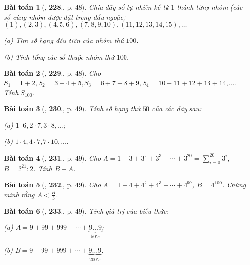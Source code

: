 \documentclass{article}
\numberwithin{equation}{section}
\newtheorem{baitoan}{Bài toán}[section]
\begin{document}
\begin{baitoan}[\cite{Binh_Toan_6_tap_1}, \textbf{228.}, p. 48]
	Chia dãy số tự nhiên kể từ $1$ thành từng nhóm (các số cùng nhóm được đặt trong dấu ngoặc) $(1),(2,3),(4,5,6),(7,8,9,10),(11,12,13,14,15),\ldots$
	\begin{enumerate*}
		\item[(a)] Tìm số hạng đầu tiên của nhóm thứ $100$.
		\item[(b)] Tính tổng các số thuộc nhóm thứ $100$.
	\end{enumerate*}
\end{baitoan}

\begin{baitoan}[\cite{Binh_Toan_6_tap_1}, \textbf{229.}, p. 48]
	Cho $S_1 = 1 + 2, S_2 = 3 + 4 + 5, S_3 = 6 + 7 + 8 + 9, S_4 = 10 + 11 + 12 + 13 + 14,\ldots$. Tính $S_{100}$.
\end{baitoan}

\begin{baitoan}[\cite{Binh_Toan_6_tap_1}, \textbf{230.}, p. 49]
	Tính số hạng thứ $50$ của các dãy sau:
	\begin{enumerate*}
		\item[(a)] $1\cdot 6,2\cdot 7,3\cdot 8,\ldots$;
		\item[(b)] $1\cdot 4,4\cdot 7,7\cdot 10,\ldots$.
	\end{enumerate*}
\end{baitoan}

\begin{baitoan}[\cite{Binh_Toan_6_tap_1}, \textbf{231.}, p. 49]
	Cho $A = 1 + 3 + 3^2 + 3^3 + \cdots + 3^{20} = \sum_{i=0}^{20} 3^i$, $B = 3^{21}:2$. Tính $B - A$.
\end{baitoan}

\begin{baitoan}[\cite{Binh_Toan_6_tap_1}, \textbf{232.}, p. 49]
	Cho $A = 1 + 4 + 4^2 + 4^3 + \cdots + 4^{99}$, $B = 4^{100}$. Chứng minh rằng $A < \frac{B}{3}$.
\end{baitoan}

\begin{baitoan}[\cite{Binh_Toan_6_tap_1}, \textbf{233.}, p. 49]
	Tính giá trị của biểu thức:
	
	\begin{enumerate*}
		\item[(a)] $A = 9 + 99 + 999 + \cdots + \underbrace{9\ldots 9}_{50's}$;
		\item[(b)] $B = 9 + 99 + 999 + \cdots + \underbrace{9\ldots 9}_{200's}$.
	\end{enumerate*}
\end{baitoan}
\end{document}
